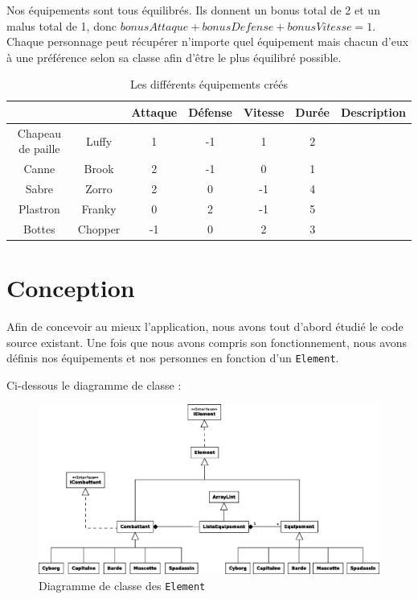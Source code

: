 \documentclass[12pt,a4paper,openany]{book}
\begin{document}
	 Nos équipements sont tous équilibrés. Ils donnent un bonus total de 2 et un malus total de 1, donc $bonusAttaque+bonusDefense+bonusVitesse = 1$.
	 Chaque personnage peut récupérer n'importe quel équipement mais chacun d’eux à une préférence selon sa classe afin d'être le plus équilibré possible.

	 \begin{table}[H]
		 \centering
		 \normalsize
	 \begin{tabular}{cc|ccccp{5.0cm}}
			&& Attaque & Défense & Vitesse & Durée&Description\\
			\hline
			{Chapeau de paille} & Luffy & 1 & -1 & 1 & 2 & \footnotesize \\
			\hline
			{Canne} & Brook & 2 & -1 & 0 & 1 & \footnotesize \\
			\hline
			{Sabre} & Zorro & 2 & 0 & -1& 4& \footnotesize \\
			\hline
			{Plastron} & Franky & 0 & 2 & -1 & 5 & \footnotesize \\
			\hline
			{Bottes} & Chopper&-1&0&2&3& \footnotesize \\
			\hline
		\end{tabular}
		\caption{Les différents équipements créés}
	\end{table}

	\section{Conception}
		Afin de concevoir au mieux l'application, nous avons tout d'abord étudié le code source existant. Une fois que nous avons compris son fonctionnement,
		nous avons définis nos équipements et nos personnes en fonction d'un \texttt{Element}.

		Ci-dessous le diagramme de classe : 

		\begin{figure}[H]
			\centering
			\includegraphics[width=14.5cm]{Diagramme1.eps}
			\caption{Diagramme de classe des \texttt{Element}}
		\end{figure}
\end{document}

